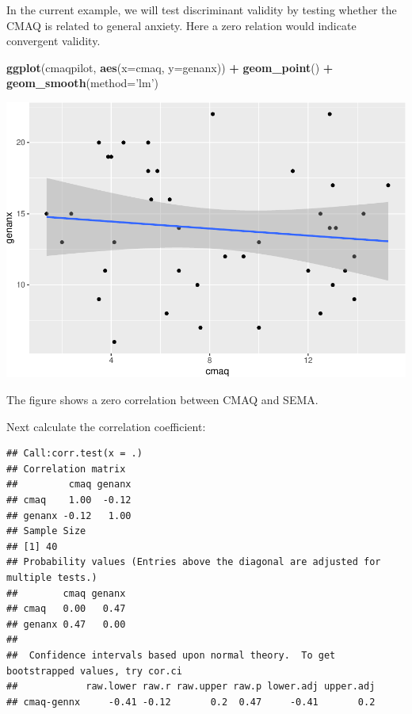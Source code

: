 \documentclass[
]{book}
\newenvironment{Shaded}{\begin{snugshade}}{\end{snugshade}}
\newcommand{\DataTypeTok}[1]{\textcolor[rgb]{0.13,0.29,0.53}{#1}}
\newcommand{\KeywordTok}[1]{\textcolor[rgb]{0.13,0.29,0.53}{\textbf{#1}}}
\newcommand{\NormalTok}[1]{#1}
\newcommand{\OperatorTok}[1]{\textcolor[rgb]{0.81,0.36,0.00}{\textbf{#1}}}
\newcommand{\OtherTok}[1]{\textcolor[rgb]{0.56,0.35,0.01}{#1}}
\newcommand{\StringTok}[1]{\textcolor[rgb]{0.31,0.60,0.02}{#1}}
\begin{document}
In the current example, we will test discriminant validity by testing whether the CMAQ is related to general anxiety. Here a zero relation would indicate convergent validity.

\begin{Shaded}
\begin{Highlighting}[]
\KeywordTok{ggplot}\NormalTok{(cmaqpilot, }\KeywordTok{aes}\NormalTok{(}\DataTypeTok{x=}\NormalTok{cmaq, }\DataTypeTok{y=}\NormalTok{genanx)) }\OperatorTok{+}
\StringTok{  }\KeywordTok{geom_point}\NormalTok{() }\OperatorTok{+}
\StringTok{  }\KeywordTok{geom_smooth}\NormalTok{(}\DataTypeTok{method=}\StringTok{'lm'}\NormalTok{)}
\end{Highlighting}
\end{Shaded}

\includegraphics{Tools-for-working-with-data-211_files/figure-latex/unnamed-chunk-28-1.pdf}

The figure shows a zero correlation between CMAQ and SEMA.

Next calculate the correlation coefficient:

\begin{Shaded}
\end{Shaded}

\begin{verbatim}
## Call:corr.test(x = .)
## Correlation matrix 
##         cmaq genanx
## cmaq    1.00  -0.12
## genanx -0.12   1.00
## Sample Size 
## [1] 40
## Probability values (Entries above the diagonal are adjusted for multiple tests.) 
##        cmaq genanx
## cmaq   0.00   0.47
## genanx 0.47   0.00
## 
##  Confidence intervals based upon normal theory.  To get bootstrapped values, try cor.ci
##            raw.lower raw.r raw.upper raw.p lower.adj upper.adj
## cmaq-gennx     -0.41 -0.12       0.2  0.47     -0.41       0.2
\end{verbatim}
\end{document}
